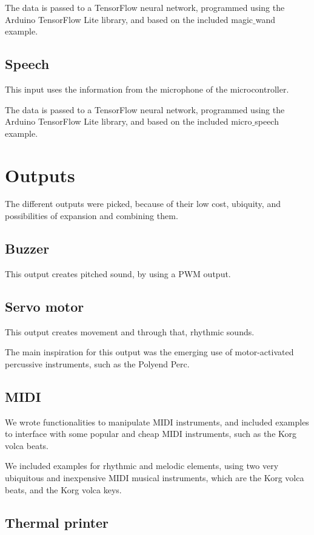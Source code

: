 The data is passed to a TensorFlow neural network, programmed using the Arduino TensorFlow Lite library, and based on the included magic$\_$wand example.

\subsection{Speech}

This input uses the information from the microphone of the microcontroller.

The data is passed to a TensorFlow neural network, programmed using the Arduino TensorFlow Lite library, and based on the included micro$\_$speech example.

\section{Outputs}

The different outputs were picked, because of their low cost, ubiquity, and possibilities of expansion and combining them.

\subsection{Buzzer}

This output creates pitched sound, by using a PWM output.

\subsection{Servo motor}

This output creates movement and through that, rhythmic sounds.

The main inspiration for this output was the emerging use of motor-activated percussive instruments, such as the Polyend Perc.

\subsection{MIDI}

We wrote functionalities to manipulate MIDI instruments, and included examples to interface with some popular and cheap MIDI instruments, such as the Korg volca beats.

We included examples for rhythmic and melodic elements, using two very ubiquitous and inexpensive MIDI musical instruments, which are the Korg volca beats, and the Korg volca keys.

\subsection{Thermal printer}

